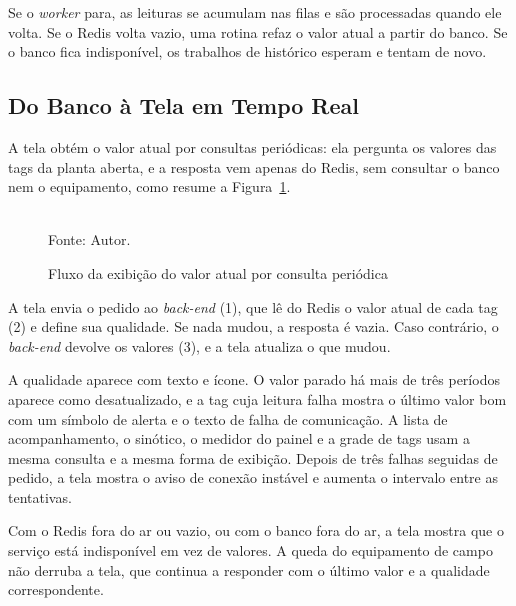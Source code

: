 \par Se o \emph{worker} para, as leituras se acumulam nas filas e são processadas quando ele volta. Se o Redis volta vazio, uma rotina refaz o valor atual a partir do banco. Se o banco fica indisponível, os trabalhos de histórico esperam e tentam de novo.

\subsection{Do Banco à Tela em Tempo Real}

\par A tela obtém o valor atual por consultas periódicas: ela pergunta os valores das tags da planta aberta, e a resposta vem apenas do Redis, sem consultar o banco nem o equipamento, como resume a Figura~\ref{fig:fx_polling}.

\begin{figure}[H]
    \centering
    \caption{Fluxo da exibição do valor atual por consulta periódica}
    \label{fig:fx_polling}
    \vspace{0.4cm}
    \vspace{0.2cm} \\
    Fonte: Autor.
\end{figure}

\par A tela envia o pedido ao \emph{back-end} (1), que lê do Redis o valor atual de cada tag (2) e define sua qualidade. Se nada mudou, a resposta é vazia. Caso contrário, o \emph{back-end} devolve os valores (3), e a tela atualiza o que mudou.

\par A qualidade aparece com texto e ícone. O valor parado há mais de três períodos aparece como desatualizado, e a tag cuja leitura falha mostra o último valor bom com um símbolo de alerta e o texto de falha de comunicação. A lista de acompanhamento, o sinótico, o medidor do painel e a grade de tags usam a mesma consulta e a mesma forma de exibição. Depois de três falhas seguidas de pedido, a tela mostra o aviso de conexão instável e aumenta o intervalo entre as tentativas.

\par Com o Redis fora do ar ou vazio, ou com o banco fora do ar, a tela mostra que o serviço está indisponível em vez de valores. A queda do equipamento de campo não derruba a tela, que continua a responder com o último valor e a qualidade correspondente.

